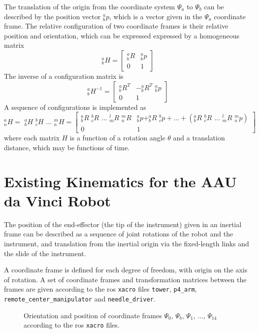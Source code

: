 The translation of the origin from the coordinate system $\Psi_a$ to $\Psi_b$ can be described by the position vector $^a_bp$, which is a vector given in the $\Psi_a$ coordinate frame.
The relative configuration of two coordinate frames is their relative position and orientation, which can be expressed expressed by a homogeneous matrix
\begin{equation}
^a_bH = 
\begin{bmatrix}
^a_bR & ^a_bp\\
0 & 1
\end{bmatrix}
\end{equation}
The inverse of a configuration matrix is
\begin{equation}
^a_bH^{-1} = 
\begin{bmatrix}
^a_bR^T & -^a_bR^T\,\,^a_bp\\
0 & 1
\end{bmatrix}
\end{equation}
A sequence of configurations is implemented as
\begin{equation}
^a_nH =\,\, ^a_bH \,\, ^b_cH \,\,...\,\, ^m_nH = 
\begin{bmatrix}
^a_bR \,\, ^b_cR \,\,...\,\, ^l_mR \,\,^m_nR & ^a_bp + ^a_bR \,\, ^b_cp + ... + (^a_bR\,\, ^b_cR \,\,...\,\, ^l_mR \,\, ^m_np )\\
0 & 1
\end{bmatrix}
\end{equation}
where each matrix $H$ is a function of a rotation angle $\theta$ and a translation distance, which may be functions of time.


\section{Existing Kinematics for the AAU da Vinci Robot}
The position of the end-effector (the tip of the instrument) given in an inertial frame can be described as a sequence of joint rotations of the robot and the instrument, and translation from the inertial origin via the fixed-length links and the slide of the instrument.

A coordinate frame is defined for each degree of freedom, with origin on the axis of rotation. A set of coordinate frames and transformation matrices between the frames are given according to the \gls{ros} \texttt{xacro} files \texttt{tower}, \texttt{p4\_arm}, \texttt{remote\_center\_manipulator} and \texttt{needle\_driver}.

\begin{figure}[htbp]
	\hspace{-10mm}
	\vspace{1mm}
	\caption{Orientation and position of coordinate frames $\Psi_0$, $\Psi_b$, $\Psi_1$, ..., $\Psi_{14}$ according to the \gls{ros} \texttt{xacro} files.}
	\label{fig:robot_xacro_frames}
\end{figure}

